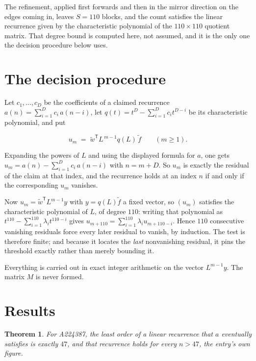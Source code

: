 \documentclass[11pt]{article}
\newtheorem{theorem}{Theorem}
\theoremstyle{definition}
\begin{document}
The refinement, applied first forwards and then in the mirror direction on the edges coming in, leaves $S = 110$ blocks, and the count satisfies the linear recurrence given by the characteristic polynomial of the $110 \times 110$ quotient matrix. That degree bound is computed here, not assumed, and it is the only one the decision procedure below uses.

\section{The decision procedure}

Let $c_1,\dots,c_D$ be the coefficients of a claimed recurrence $a(n) = \sum_{i=1}^{D} c_i\,a(n-i)$, let $q(t) = t^{D} - \sum_{i=1}^{D} c_i t^{D-i}$ be its characteristic polynomial, and put

\[u_m \;=\; \tilde w^{\mathsf T} L^{\,m-1} q(L)\,\tilde f \qquad (m \ge 1).\]

Expanding the powers of $L$ and using the displayed formula for $a$, one gets $u_m = a(n) - \sum_{i=1}^{D} c_i\,a(n-i)$ with $n = m + D$. So $u_m$ is exactly the residual of the claim at that index, and the recurrence holds at an index $n$ if and only if the corresponding $u_m$ vanishes.

Now $u_m = \tilde w^{\mathsf T} L^{m-1} y$ with $y = q(L)\tilde f$ a fixed vector, so $(u_m)$ satisfies the characteristic polynomial of $L$, of degree $110$: writing that polynomial as $t^{110} - \sum_{i=1}^{110} \lambda_i t^{110-i}$ gives $u_{m+110} = \sum_{i=1}^{110} \lambda_i u_{m+110-i}$. Hence $110$ consecutive vanishing residuals force every later residual to vanish, by induction. The test is therefore finite; and because it locates the {\itshape last} nonvanishing residual, it pins the threshold exactly rather than merely bounding it.

Everything is carried out in exact integer arithmetic on the vector $L^{m-1}y$. The matrix $M$ is never formed.

\section{Results}

\begin{theorem} For A224387, the least order of a linear recurrence that $a$ eventually satisfies is exactly $47$, and that recurrence holds for every $n > 47$, the entry's own figure.\end{theorem}
\end{document}
